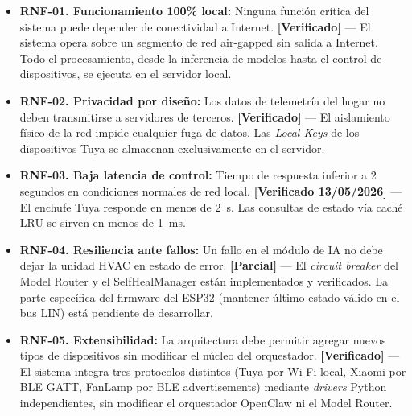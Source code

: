 \begin{itemize}
    \item \textbf{RNF-01. Funcionamiento 100\% local:} Ninguna función crítica del sistema puede depender de conectividad a Internet. \textbf{[Verificado]} --- El sistema opera sobre un segmento de red air-gapped sin salida a Internet. Todo el procesamiento, desde la inferencia de modelos hasta el control de dispositivos, se ejecuta en el servidor local.

    \item \textbf{RNF-02. Privacidad por diseño:} Los datos de telemetría del hogar no deben transmitirse a servidores de terceros. \textbf{[Verificado]} --- El aislamiento físico de la red impide cualquier fuga de datos. Las \textit{Local Keys} de los dispositivos Tuya se almacenan exclusivamente en el servidor.

    \item \textbf{RNF-03. Baja latencia de control:} Tiempo de respuesta inferior a 2 segundos en condiciones normales de red local. \textbf{[Verificado 13/05/2026]} --- El enchufe Tuya responde en menos de 2~s. Las consultas de estado vía caché LRU se sirven en menos de 1~ms.

    \item \textbf{RNF-04. Resiliencia ante fallos:} Un fallo en el módulo de IA no debe dejar la unidad HVAC en estado de error. \textbf{[Parcial]} --- El \textit{circuit breaker} del Model Router y el SelfHealManager están implementados y verificados. La parte específica del firmware del ESP32 (mantener último estado válido en el bus LIN) está pendiente de desarrollar.

    \item \textbf{RNF-05. Extensibilidad:} La arquitectura debe permitir agregar nuevos tipos de dispositivos sin modificar el núcleo del orquestador. \textbf{[Verificado]} --- El sistema integra tres protocolos distintos (Tuya por Wi-Fi local, Xiaomi por BLE GATT, FanLamp por BLE advertisements) mediante \textit{drivers} Python independientes, sin modificar el orquestador OpenClaw ni el Model Router.
\end{itemize}
